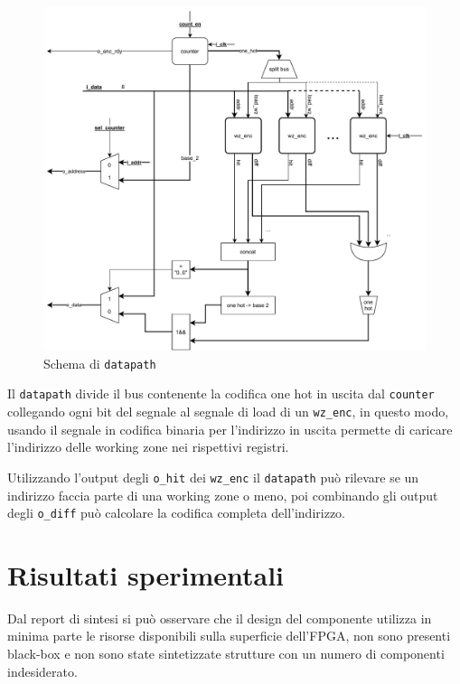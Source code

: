 \documentclass[a4paper]{article}
\begin{document}
\begin{figure}[H]
  \includegraphics[width=\linewidth]{schema-datapath.pdf}
  \caption{Schema di \texttt{datapath}}
\end{figure}

Il \texttt{datapath} divide il bus contenente la codifica one hot in uscita dal \texttt{counter} collegando ogni bit del segnale al segnale di load di un \texttt{wz\_enc}, in questo modo, usando il segnale in codifica binaria per l'indirizzo in uscita permette di caricare l'indirizzo delle working zone nei rispettivi registri. 

Utilizzando l'output degli \texttt{o\_hit} dei \texttt{wz\_enc} il \texttt{datapath} può rilevare se un indirizzo faccia parte di una working zone o meno, poi combinando gli output degli \texttt{o\_diff} può calcolare la codifica completa dell'indirizzo.


\section{Risultati sperimentali}

Dal report di sintesi si può osservare che il design del componente utilizza in minima parte le risorse disponibili sulla superficie dell'FPGA, non sono presenti black-box e non sono state sintetizzate strutture con un numero di componenti indesiderato.
\end{document}
